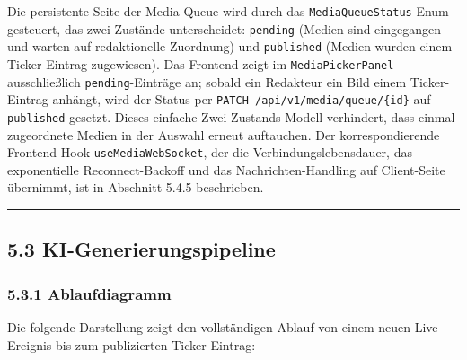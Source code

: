 Die persistente Seite der Media-Queue wird durch das
\texttt{MediaQueueStatus}-Enum gesteuert, das zwei Zustände
unterscheidet: \texttt{pending} (Medien sind eingegangen und warten auf
redaktionelle Zuordnung) und \texttt{published} (Medien wurden einem
Ticker-Eintrag zugewiesen). Das Frontend zeigt im
\texttt{MediaPickerPanel} ausschließlich \texttt{pending}-Einträge an;
sobald ein Redakteur ein Bild einem Ticker-Eintrag anhängt, wird der
Status per \texttt{PATCH\ /api/v1/media/queue/\{id\}} auf
\texttt{published} gesetzt. Dieses einfache Zwei-Zustands-Modell
verhindert, dass einmal zugeordnete Medien in der Auswahl erneut
auftauchen. Der korrespondierende Frontend-Hook
\texttt{useMediaWebSocket}, der die Verbindungslebensdauer, das
exponentielle Reconnect-Backoff und das Nachrichten-Handling auf
Client-Seite übernimmt, ist in Abschnitt 5.4.5 beschrieben.

\begin{center}\rule{0.5\linewidth}{0.5pt}\end{center}

\subsection{5.3 KI-Generierungspipeline}\label{ki-generierungspipeline}

\subsubsection{5.3.1 Ablaufdiagramm}\label{ablaufdiagramm}

Die folgende Darstellung zeigt den vollständigen Ablauf von einem neuen
Live-Ereignis bis zum publizierten Ticker-Eintrag:


